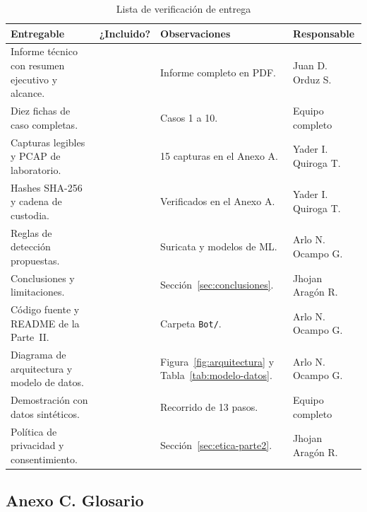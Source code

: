 \begin{table}[H]
	\caption{Lista de verificación de entrega}
	\label{tab:checklist-entrega}
	\centering
	\footnotesize
	\renewcommand{\arraystretch}{1.3}
	\begin{tabularx}{\textwidth}{@{}>{\raggedright\arraybackslash}p{} c Y >{\raggedright\arraybackslash}p{0.14\textwidth}@{}}
		\toprule
		\textbf{Entregable} & \textbf{¿Incluido?} & \textbf{Observaciones} & \textbf{Responsable} \\
		\midrule
		Informe técnico con resumen ejecutivo y alcance. & \checkedbox & Informe completo en PDF. & Juan D. Orduz S. \\
		Diez fichas de caso completas. & \checkedbox & Casos 1 a 10. & Equipo completo \\
		Capturas legibles y PCAP de laboratorio. & \checkedbox & 15 capturas en el Anexo A. & Yader I. Quiroga T. \\
		Hashes SHA-256 y cadena de custodia. & \checkedbox & Verificados en el Anexo A. & Yader I. Quiroga T. \\
		Reglas de detección propuestas. & \checkedbox & Suricata y modelos de ML. & Arlo N. Ocampo G. \\
		Conclusiones y limitaciones. & \checkedbox & Sección~\ref{sec:conclusiones}. & Jhojan Aragón R. \\
		Código fuente y README de la Parte~II. & \checkedbox & Carpeta \texttt{Bot/}. & Arlo N. Ocampo G. \\
		Diagrama de arquitectura y modelo de datos. & \checkedbox & Figura~\ref{fig:arquitectura} y Tabla~\ref{tab:modelo-datos}. & Arlo N. Ocampo G. \\
		Demostración con datos sintéticos. & \checkedbox & Recorrido de 13 pasos. & Equipo completo \\
		Política de privacidad y consentimiento. & \checkedbox & Sección~\ref{sec:etica-parte2}. & Jhojan Aragón R. \\
		\bottomrule
	\end{tabularx}
\end{table}

\subsection*{Anexo C. Glosario}

